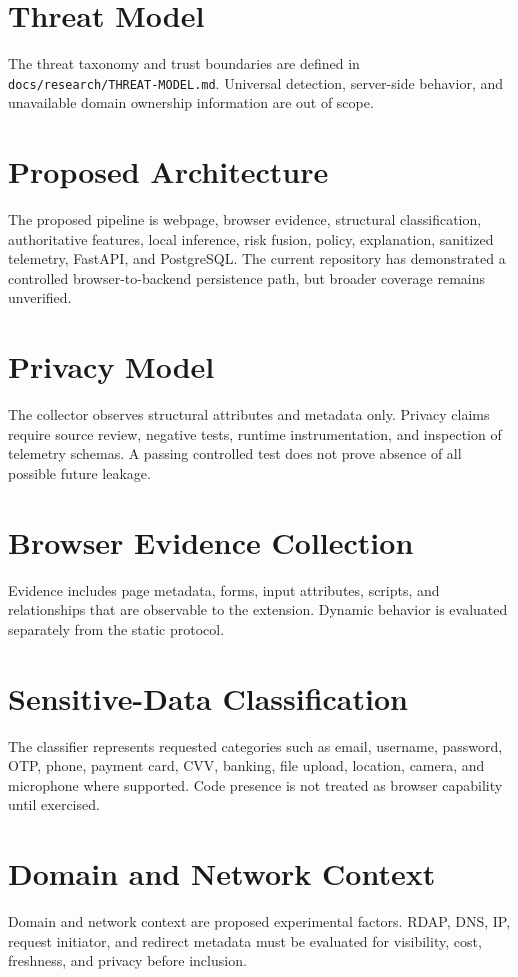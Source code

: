 \documentclass[journal]{IEEEtran}
\begin{document}
\section{Threat Model}
The threat taxonomy and trust boundaries are defined in \texttt{docs/research/THREAT-MODEL.md}. Universal detection, server-side behavior, and unavailable domain ownership information are out of scope.

\section{Proposed Architecture}
The proposed pipeline is webpage, browser evidence, structural classification, authoritative features, local inference, risk fusion, policy, explanation, sanitized telemetry, FastAPI, and PostgreSQL. The current repository has demonstrated a controlled browser-to-backend persistence path, but broader coverage remains unverified.

\section{Privacy Model}
The collector observes structural attributes and metadata only. Privacy claims require source review, negative tests, runtime instrumentation, and inspection of telemetry schemas. A passing controlled test does not prove absence of all possible future leakage.

\section{Browser Evidence Collection}
Evidence includes page metadata, forms, input attributes, scripts, and relationships that are observable to the extension. Dynamic behavior is evaluated separately from the static protocol.

\section{Sensitive-Data Classification}
The classifier represents requested categories such as email, username, password, OTP, phone, payment card, CVV, banking, file upload, location, camera, and microphone where supported. Code presence is not treated as browser capability until exercised.

\section{Domain and Network Context}
Domain and network context are proposed experimental factors. RDAP, DNS, IP, request initiator, and redirect metadata must be evaluated for visibility, cost, freshness, and privacy before inclusion.
\end{document}

